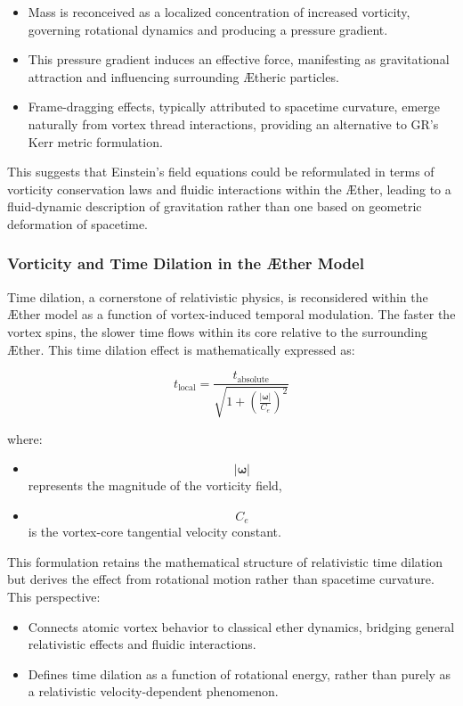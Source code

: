 \documentclass[a4paper,10pt]{article}
\begin{document}
    \begin{itemize}
        \item Mass is reconceived as a localized concentration of increased vorticity, governing rotational dynamics and producing a pressure gradient.
        \item This pressure gradient induces an effective force, manifesting as gravitational attraction and influencing surrounding \AE theric particles.
        \item Frame-dragging effects, typically attributed to spacetime curvature, emerge naturally from vortex thread interactions, providing an alternative to GR’s Kerr metric formulation.
    \end{itemize}
    This suggests that Einstein's field equations could be reformulated in terms of vorticity conservation laws and fluidic interactions within the \AE ther, leading to a fluid-dynamic description of gravitation rather than one based on geometric deformation of spacetime.

    \subsubsection*{Vorticity and Time Dilation in the \AE ther Model}
    Time dilation, a cornerstone of relativistic physics, is reconsidered within the \AE ther model as a function of vortex-induced temporal modulation. The faster the vortex spins, the slower time flows within its core relative to the surrounding \AE ther. This time dilation effect is mathematically expressed as:

    \begin{equation}
      t_{\text{local}} = \frac{t_{\text{absolute}}}{\sqrt{1 + \left( \frac{|\boldsymbol{\omega}|}{C_e} \right)^2 }}
    \end{equation}

    where:

    \begin{itemize}
        \item $$|\boldsymbol{\omega}|$$ represents the magnitude of the vorticity field,
        \item $$C_e$$ is the vortex-core tangential velocity constant.
    \end{itemize}
    This formulation retains the mathematical structure of relativistic time dilation but derives the effect from rotational motion rather than spacetime curvature. This perspective:

    \begin{itemize}
        \item Connects atomic vortex behavior to classical ether dynamics, bridging general relativistic effects and fluidic interactions.
        \item Defines time dilation as a function of rotational energy, rather than purely as a relativistic velocity-dependent phenomenon.
    \end{itemize}
\end{document}

